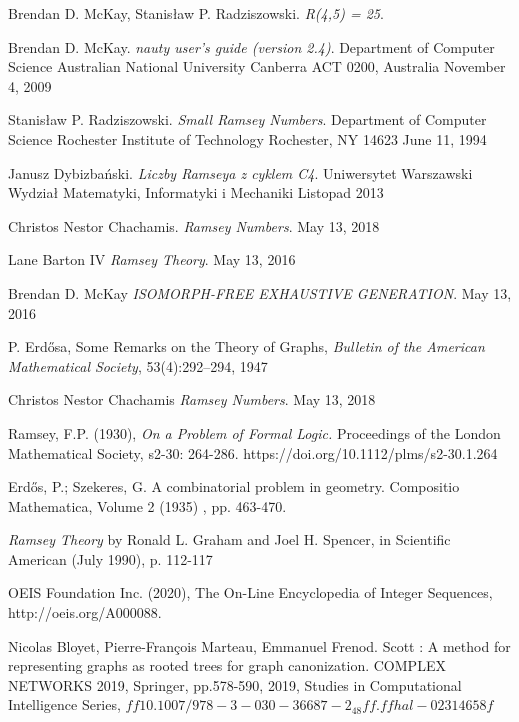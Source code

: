 
\pagebreak
\begin{thebibliography}{9}
  Brendan D. McKay, Stanisław P. Radziszowski. 
  \textit{R(4,5) = 25}. 
  
  Brendan D. McKay.
  \textit{nauty user's guide (version 2.4)}.  
  Department of Computer Science
  Australian National University
  Canberra ACT 0200, Australia
  November 4, 2009

  Stanisław P. Radziszowski.
  \textit{Small Ramsey Numbers}.  
  Department of Computer Science Rochester Institute of Technology Rochester, NY 14623
  June 11, 1994

  Janusz Dybizbański.
  \textit{Liczby Ramseya z cyklem C4}.  
  Uniwersytet Warszawski
  Wydział Matematyki, Informatyki i Mechaniki
  Listopad 2013

  Christos Nestor Chachamis.
  \textit{Ramsey Numbers}.  
  May 13, 2018

  Lane Barton IV
  \textit{Ramsey Theory}.  
  May 13, 2016

  Brendan D. McKay
  \textit{ISOMORPH-FREE EXHAUSTIVE GENERATION}.  
  May 13, 2016
  
  P.  Erdősa,  Some  Remarks  on  the  Theory  of  Graphs,
  \textit{Bulletin  of  the  American  Mathematical  Society},
  53(4):292–294,  1947
  
  Christos Nestor Chachamis
  \textit{Ramsey Numbers}.  
  May 13, 2018

 Ramsey, F.P. (1930), 
 \textit{On a Problem of Formal Logic.}
 Proceedings of the London Mathematical Society, s2-30: 264-286. https://doi.org/10.1112/plms/s2-30.1.264
 
 Erdős, P.; Szekeres, G.
 A combinatorial problem in geometry. Compositio Mathematica, Volume 2 (1935) , pp. 463-470.
  
  \textit{Ramsey Theory}
   by Ronald L. Graham and Joel H. Spencer, in Scientific American (July 1990), p. 112-117
   
       OEIS Foundation Inc. (2020), The On-Line Encyclopedia of Integer Sequences, http://oeis.org/A000088.

       Nicolas Bloyet, Pierre-François Marteau, Emmanuel Frenod. Scott : A method for representing graphs
      as rooted trees for graph canonization. COMPLEX NETWORKS 2019, Springer, pp.578-590, 2019,
      Studies in Computational Intelligence Series, $ff10.1007/978-3-030-36687-2_48ff. ffhal-02314658f$
      

\end{thebibliography}
